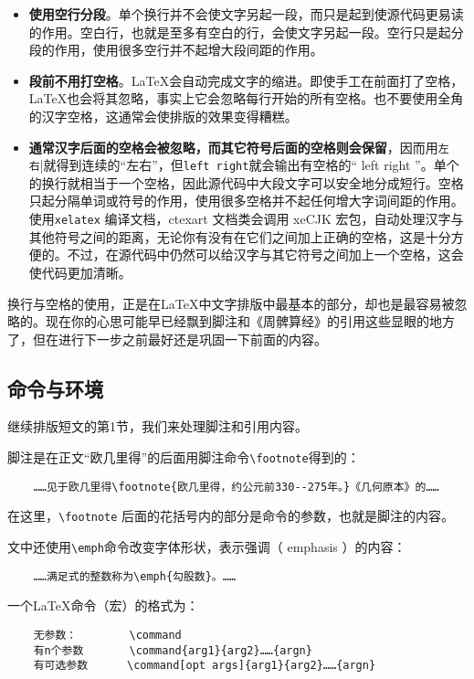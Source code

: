 \begin{itemize}
    \item \textbf{使用空行分段}。单个换行并不会使文字另起一段，而只是起到使源代码更易读的作用。空白行，也就是至多有空白的行，会使文字另起一段。空行只是起分段的作用，使用很多空行并不起增大段间距的作用。
    \item \textbf{段前不用打空格}。\LaTeX 会自动完成文字的缩进。即使手工在前面打了空格，\LaTeX 也会将其忽略，事实上它会忽略每行开始的所有空格。也不要使用全角的汉字空格，这通常会使排版的效果变得糟糕。
    \item \textbf{通常汉字后面的空格会被忽略，而其它符号后面的空格则会保留}，因而用\lstinline[showspaces=true]{左 右}|就得到连续的“左右”，但\lstinline[showspaces=true]{left right}就会输出有空格的“ left right ”。单个的换行就相当于一个空格，因此源代码中大段文字可以安全地分成短行。空格只起分隔单词或符号的作用，使用很多空格并不起任何增大字词间距的作用。使用\verb|xelatex| 编译文档，ctexart 文档类会调用 xeCJK 宏包，自动处理汉字与其他符号之间的距离，无论你有没有在它们之间加上正确的空格，这是十分方便的。不过，在源代码中仍然可以给汉字与其它符号之间加上一个空格，这会使代码更加清晰。
\end{itemize}

换行与空格的使用，正是在\LaTeX 中文字排版中最基本的部分，却也是最容易被忽略的。现在你的心思可能早已经飘到脚注和《周髀算经》的引用这些显眼的地方了，但在进行下一步之前最好还是巩固一下前面的内容。

\subsection{命令与环境}

继续排版短文的第1节，我们来处理脚注和引用内容。

脚注是在正文“欧几里得”的后面用脚注命令\verb|\footnote|得到的：
\begin{lstlisting}
    ……见于欧几里得\footnote{欧几里得，约公元前330--275年。}《几何原本》的……
\end{lstlisting}
在这里，\verb|\footnote| 后面的花括号内的部分是命令的参数，也就是脚注的内容。

文中还使用\verb|\emph|命令改变字体形状，表示强调（ emphasis ）的内容：
\begin{lstlisting}
    ……满足式的整数称为\emph{勾股数}。……
\end{lstlisting}

一个\LaTeX 命令（宏）的格式为：
\begin{lstlisting}
    无参数：        \command
    有n个参数       \command{arg1}{arg2}……{argn}
    有可选参数      \command[opt args]{arg1}{arg2}……{argn}
\end{lstlisting}

